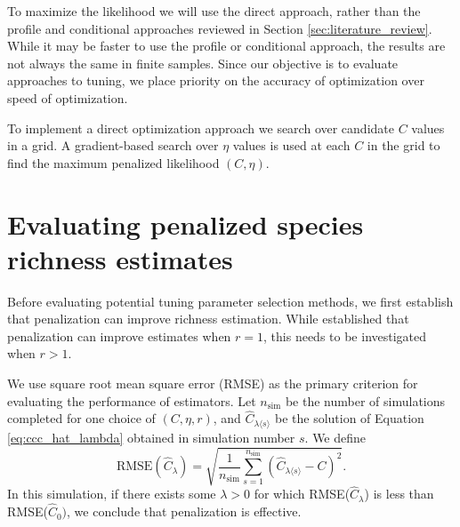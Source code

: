 \documentclass[12pt]{article}
\begin{document}
To maximize the likelihood we will use the direct approach, rather than the profile and conditional approaches reviewed in Section \ref{sec:literature_review}.  While it may be faster to use the profile or conditional approach, the results are not always the same in finite samples.
Since our objective is to evaluate approaches to tuning, we place priority on the accuracy of optimization over speed of optimization.

To implement a direct optimization approach we search over candidate $C$ values in a grid.  A gradient-based search over $\eta$ values is used at each $C$ in the grid to find the maximum penalized likelihood  $(C, \eta)$.

\section{Evaluating penalized species richness estimates}
\label{sec:efficacy_sims}

Before evaluating potential tuning parameter selection methods, we first establish that penalization can improve richness estimation. While \citet{wang_2005} established that penalization can improve estimates when $r = 1$, this needs to be investigated when $r> 1$.

We use square root mean square error (RMSE) as the primary criterion for evaluating the performance of estimators.  Let $n_{\text{sim}}$ be the number of simulations completed for one choice of $(C, \eta, r)$, and $\widehat{C}_{\lambda \langle s \rangle}$ be the solution of Equation \eqref{eq:ccc_hat_lambda} obtained in simulation number $s$.  We define
\begin{equation}
 \text{RMSE}\left( \widehat{C}_{\lambda} \right) = \sqrt{ \frac{1}{n_{\text{sim}}} \sum_{s=1}^{n_{\text{sim}}} \left( \widehat{C}_{\lambda \langle s \rangle} - C\right)^2 }.
\end{equation}
In this simulation, if there exists some $\lambda > 0$ for which RMSE($\widehat{C}_{\lambda}$) is less than RMSE($\widehat{C}_0)$, we conclude that penalization is effective.
\end{document}
